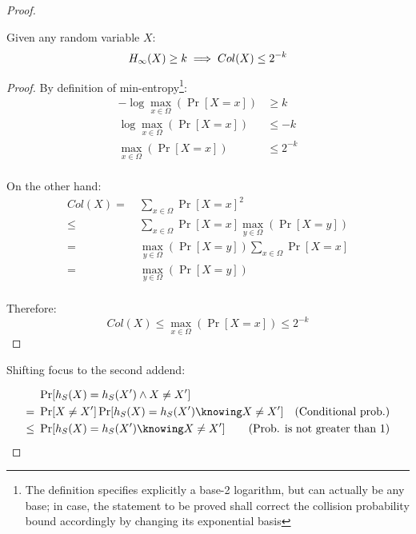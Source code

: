 \begin{proof}
    \begin{proposition}
        Given any random variable $X$:
        \[
            H_\infty(X) \geq k \implies Col(X) \leq 2^{-k} \qedhere
        \]
    \end{proposition}

    \begin{proof}
        By definition of min-entropy\footnote{The definition specifies explicitly a base-2 logarithm, but can actually be any base; in case, the statement to be proved shall correct the collision probability bound accordingly by changing its exponential basis}:
        \begin{align*}
            -\log \max_{x \in \Omega}(\Pr [X = x]) &\geq k      \\
            \log \max_{x \in \Omega}(\Pr [X = x])  &\leq -k     \\
            \max_{x \in \Omega}(\Pr [X = x])       &\leq 2^{-k} \\
        \end{align*}

        On the other hand:
        \begin{align*}
            Col(X) =&\ \sum_{x \in \Omega} \Pr[X = x]^2                               \\
                \leq&\ \sum_{x \in \Omega} \Pr[X = x] \max_{y \in \Omega}(\Pr[X = y]) \\
                   =&\ \max_{y \in \Omega}(\Pr[X = y]) \sum_{x \in \Omega} \Pr[X = x] \\
                   =&\ \max_{y \in \Omega}(\Pr[X = y])                                \\
        \end{align*}

        Therefore:
        \[
            Col(X) \leq \max_{x \in \Omega}(\Pr[X = x]) \leq 2^{-k}
        \]
    \end{proof}

    Shifting focus to the second addend:

    \begin{align*}
            &\ \Pr[h_S(X) = h_S(X') \wedge X \neq X']                  &                                                  \\
           =&\ \Pr[X \neq X'] \Pr[h_S(X) = h_S(X') \knowing X \neq X'] & \text{(Conditional prob.)}                       \\
        \leq&\ \Pr[h_S(X) = h_S(X') \knowing X \neq X']                & \mathllap{\text{(Prob. is not greater than 1)}}  \\
    \end{align*}


\end{proof}
